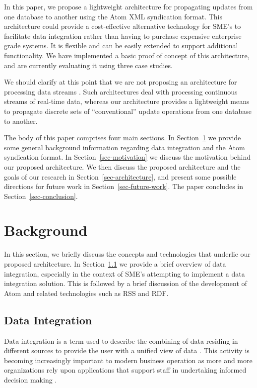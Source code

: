 \documentclass{CRPITStyle}
\begin{document}
In this paper, we propose a lightweight architecture for propagating
updates from one database to another using the Atom XML syndication
format. This architecture could provide a cost-effective alternative
technology for SME's to facilitate data integration rather than having
to purchase expensive enterprise grade systems. It is flexible and can
be easily extended to support additional functionality. We have
implemented a basic proof of concept of this architecture, and are
currently evaluating it using three case studies.

We should clarify at this point that we are not proposing an
architecture for processing data streams \cite{Babc-B-2002-Streams}.
Such architectures deal with processing continuous streams of real-time
data, whereas our architecture provides a lightweight means to propagate
discrete sets of ``conventional'' update operations from one database to
another.

The body of this paper comprises four main sections. In
Section~\ref{sec-background} we provide some general background
information regarding data integration and the Atom syndication format.
In Section~\ref{sec-motivation} we discuss the motivation behind our
proposed architecture. We then discuss the proposed architecture and the
goals of our research in Section~\ref{sec-architecture}, and present
some possible directions for future work in
Section~\ref{sec-future-work}. The paper concludes in
Section~\ref{sec-conclusion}.


\section{Background}
\label{sec-background}

In this section, we briefly discuss the concepts and technologies that
underlie our proposed architecture. In
Section~\ref{sec-data-integration} we provide a brief overview of data
integration, especially in the context of SME's attempting to implement
a data integration solution. This is followed by a brief discussion of
the development of Atom and related technologies such as RSS and RDF.


\subsection{Data Integration}
\label{sec-data-integration}

Data integration is a term used to describe the combining of data
residing in different sources to provide the user with a unified view of
data \cite{Bati-C-1986,Yu-C-2004-SIGMOD}. This activity is becoming
increasingly important to modern business operation as more and more
organizations rely upon applications that support staff in undertaking
informed decision making \cite{Calv-D-1998-CoopIS,Yu-C-2004-SIGMOD}.
\end{document}
